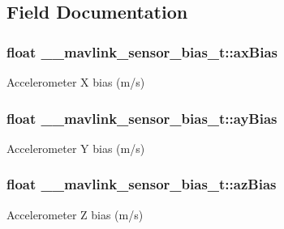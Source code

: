 \subsection{Field Documentation}
\hypertarget{struct____mavlink__sensor__bias__t_a3c422e0cda237661cb2e926cf6bd09ec}{
\subsubsection[{ax\+Bias}]{\setlength{\rightskip}{0pt plus 5cm}float \+\_\+\+\_\+mavlink\+\_\+sensor\+\_\+bias\+\_\+t\+::ax\+Bias}}\label{struct____mavlink__sensor__bias__t_a3c422e0cda237661cb2e926cf6bd09ec}


Accelerometer X bias (m/s) 

\hypertarget{struct____mavlink__sensor__bias__t_a474e1bda43538e23dd964ee33d3aa37c}{
\subsubsection[{ay\+Bias}]{\setlength{\rightskip}{0pt plus 5cm}float \+\_\+\+\_\+mavlink\+\_\+sensor\+\_\+bias\+\_\+t\+::ay\+Bias}}\label{struct____mavlink__sensor__bias__t_a474e1bda43538e23dd964ee33d3aa37c}


Accelerometer Y bias (m/s) 

\hypertarget{struct____mavlink__sensor__bias__t_a0a776dbd0df22e13fb8b96cae1f1392f}{
\subsubsection[{az\+Bias}]{\setlength{\rightskip}{0pt plus 5cm}float \+\_\+\+\_\+mavlink\+\_\+sensor\+\_\+bias\+\_\+t\+::az\+Bias}}\label{struct____mavlink__sensor__bias__t_a0a776dbd0df22e13fb8b96cae1f1392f}


Accelerometer Z bias (m/s) 

